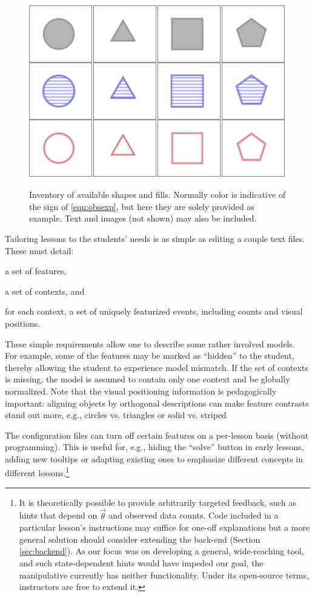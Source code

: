 \documentclass[11pt,letterpaper]{article}
\begin{document}
\begin{figure}[t]
\begin{center}
\centering
\includegraphics[scale=.5]{images/different_shapes_fills3x4.PNG}
\caption{Inventory of available shapes and fills. Normally color is indicative of 
the sign of \eqref{eqn:obsexp}, but here they are solely provided as example. 
Text and images (not shown) may also be included.}
\label{fig:shape_inventory}
\label{fig:inventory}
\end{center}
\end{figure}

Tailoring lessons to the students' needs is as simple as editing a couple text files. These must detail:
\begin{inparaenum}[(1)]
\item a set of features, 
\item a set of contexts, and
\item for each context, a set of uniquely featurized events, including counts and visual positions.
\end{inparaenum}
These simple requirements allow one to describe some rather involved models. For example, some of 
the features may be marked as ``hidden'' to the student, thereby allowing the student to experience 
model mismatch. If the set of contexts is missing, the model is assumed to contain only 
one context and be globally normalized. Note that the visual positioning information is pedagogically 
important: aligning objects by orthogonal descriptions can make feature contrasts stand out more, 
e.g., circles vs. triangles or solid vs. striped

The configuration files can turn off certain features on a per-lesson basis (without programming).  This is 
useful for, e.g., hiding the ``solve'' button in early lessons, adding new tooltips or adapting existing 
ones to emphasize different concepts in different lessons.\footnote{It is theoretically possible to provide arbitrarily targeted 
feedback, such as hints that depend on $\vec{\theta}$ and observed data counts. Code included in a particular lesson's instructions 
may suffice for one-off explanations but a more general solution should consider extending the back-end 
(Section \ref{sec:backend}). As our focus was on developing a general, wide-reaching tool, and such state-dependent 
hints would have impeded our goal, the manipulative currently has neither functionality. Under its open-source terms, 
instructors are free to extend it.}
\end{document}
